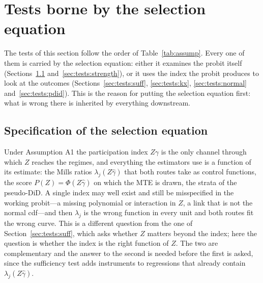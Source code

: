 \documentclass[11pt,a4paper]{article}
\theoremstyle{plain}
\theoremstyle{definition}
\theoremstyle{remark}
\newcommand{\1}{\mathbf{1}}
\begin{document}
\section{Tests borne by the selection equation}\label{sec:tests}

The tests of this section follow the order of Table~\ref{tab:assump}.
Every one of them is carried by the selection equation: either it
examines the probit itself (Sections~\ref{sec:tests:spec}
and~\ref{sec:tests:strength}), or it uses the index the probit
produces to look at the outcomes (Sections~\ref{sec:tests:suff},
\ref{sec:tests:kx}, \ref{sec:tests:normal} and~\ref{sec:tests:pdid}).
This is the reason for putting the selection equation first: what is
wrong there is inherited by everything downstream.

\subsection{Specification of the selection equation}\label{sec:tests:spec}

Under Assumption A1 the participation index $Z\gamma$ is the only
channel through which $Z$ reaches the regimes, and everything the
estimators use is a function of its estimate: the Mills ratios
$\lambda_j(Z\hat\gamma)$ that both routes take as control functions, the
score $P(Z)=\Phi(Z\hat\gamma)$ on which the MTE is drawn, the strata of
the pseudo-DiD. A single index may well exist and still be misspecified
in the working probit---a missing polynomial or interaction in $Z$, a
link that is not the normal cdf---and then $\lambda_j$ is the wrong
function in every unit and both routes fit the wrong curve. This is a
different question from the one of Section~\ref{sec:tests:suff}, which
asks whether $Z$ matters beyond the index; here the question is whether
the index is the right function of $Z$. The two are complementary and
the answer to the second is needed before the first is asked, since the
sufficiency test adds instruments to regressions that already contain
$\lambda_j(Z\hat\gamma)$.
\end{document}
